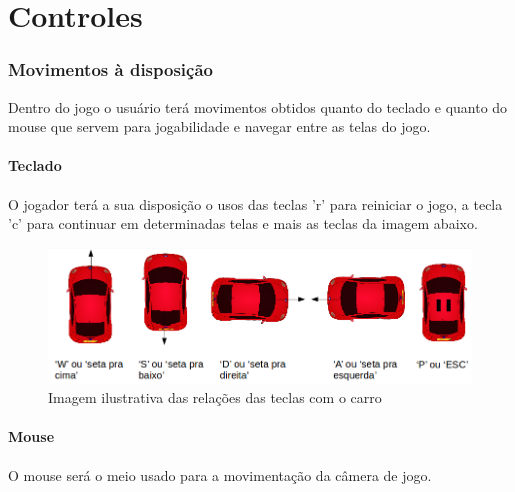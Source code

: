 \label{2}
\part{Controles}
\section{Movimentos à disposição}

Dentro do jogo o usuário terá movimentos obtidos quanto do teclado e quanto do mouse que servem para jogabilidade e navegar entre as telas do jogo.

\subsection{Teclado}

O jogador terá a sua disposição o usos das teclas 'r' para reiniciar o jogo, a tecla 'c' para continuar em determinadas telas e mais as teclas da imagem abaixo.

\label{teclas}
\begin{figure}[h]
	\centering
	\caption{Imagem ilustrativa das rela\c{c}\~oes das teclas com o carro}
		\includegraphics[keepaspectratio=true,scale=0.5]{figuras/movimentos}
\end{figure}

\subsection{Mouse}

O mouse será o meio usado para a movimentação da câmera de jogo.
